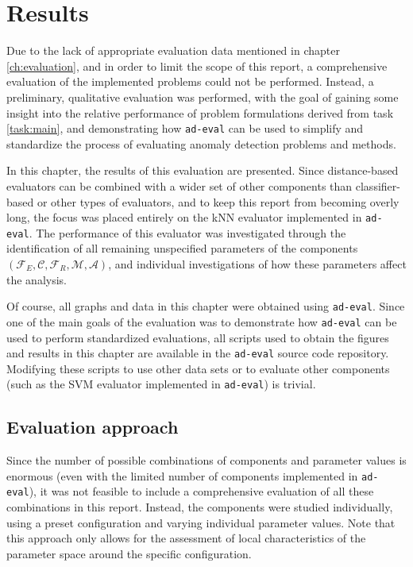 \chapter{Results}
\label{ch:results}

Due to the lack of appropriate evaluation data mentioned in chapter \ref{ch:evaluation}, and in order to limit the scope of this report, a comprehensive evaluation of the implemented problems could not be performed. Instead, a preliminary, qualitative evaluation was performed, with the goal of gaining some insight into the relative performance of problem formulations derived from task \ref{task:main}, and demonstrating how \texttt{ad-eval} can be used to simplify and standardize the process of evaluating anomaly detection problems and methods. 

In this chapter, the results of this evaluation are presented. Since distance-based evaluators can be combined with a wider set of other components than classifier-based or other types of evaluators, and to keep this report from becoming overly long, the focus was placed entirely on the kNN evaluator implemented in \texttt{ad-eval}. The performance of this evaluator was investigated through the identification of all remaining unspecified parameters of the components $(\mathcal{F}_E, \mathcal{C}, \mathcal{F}_R, \mathcal{M},\mathcal{A})$, and individual investigations of how these parameters affect the analysis.

Of course, all graphs and data in this chapter were obtained using \texttt{ad-eval}. Since one of the main goals of the evaluation was to demonstrate how \texttt{ad-eval} can be used to perform standardized evaluations, all scripts used to obtain the figures and results in this chapter are available in the \texttt{ad-eval} source code repository. Modifying these scripts to use other data sets or to evaluate other components (such as the SVM evaluator implemented in \texttt{ad-eval}) is trivial.

\section{Evaluation approach}

Since the number of possible combinations of components and parameter values is enormous (even with the limited number of components implemented in \texttt{ad-eval}), it was not feasible to include a comprehensive evaluation of all these combinations in this report. Instead, the components were studied individually, using a preset configuration and varying individual parameter values. Note that this approach only allows for the assessment of local characteristics of the parameter space around the specific configuration.

